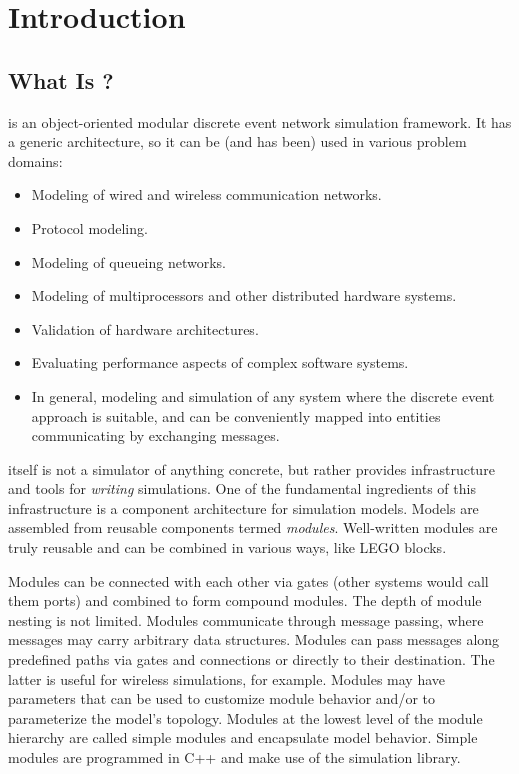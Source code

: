 \chapter{Introduction}
\label{cha:introduction}


\section{What Is {\opp}?}
\label{sec:introduction:what-is-omnetpp}

{\opp} is an object-oriented modular discrete event network simulation
framework. It has a generic architecture, so it can be (and has been)
used in various problem domains:

\begin{itemize}
  \item Modeling of wired and wireless communication networks.
  \item Protocol modeling.
  \item Modeling of queueing networks.
  \item Modeling of multiprocessors and other distributed hardware systems.
  \item Validation of hardware architectures.
  \item Evaluating performance aspects of complex software systems.
  \item In general, modeling and simulation of any system where the
    discrete event approach is suitable, and can be conveniently
    mapped into entities communicating by exchanging messages.
\end{itemize}

{\opp} itself is not a simulator of anything concrete, but rather
provides infrastructure and tools for \textit{writing} simulations. One of
the fundamental ingredients of this infrastructure is a component
architecture for simulation models. Models are assembled from reusable
components termed \textit{modules}. Well-written modules are truly reusable
and can be combined in various ways, like LEGO blocks.

Modules can be connected with each other via gates (other systems would
call them ports) and combined to form compound modules. The depth of
module nesting is not limited. Modules communicate through message passing,
where messages may carry arbitrary data structures. Modules can pass
messages along predefined paths via gates and connections or directly to
their destination. The latter is useful for wireless simulations, for
example. Modules may have parameters that can be used to customize module
behavior and/or to parameterize the model's topology.
Modules at the lowest level of the module hierarchy are called
simple modules and encapsulate model behavior. Simple modules
are programmed in C++ and make use of the simulation library.

